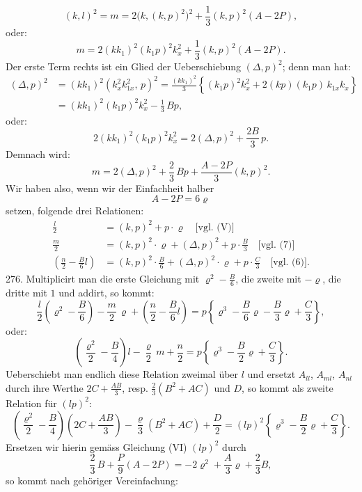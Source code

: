 \documentclass[11pt]{article}
\providecommand{\weberpage}[1]{}
\providecommand{\weq}[2]{\begin{equation}\tag{#1}#2\end{equation}}
\let\Delta\varDelta
\begin{document}
\weberpage{300}
\[
(k,l)^2 = m = 2\big(k,(k,p)^2\big)^2 + \frac{1}{3}(k,p)^2(A-2P),
\]
oder:
\[
m = 2(kk_1)^2(k_1p)^2 k_x^2 + \frac{1}{3}(k,p)^2(A-2P).
\]
Der erste Term rechts ist ein Glied der Ueberschiebung $(\Delta,p)^2$; denn man hat:
\[
\begin{aligned}
(\Delta,p)^2 &= (kk_1)^2(k_x^2 k_{1x}^2,\,p)^2 = \frac{(kk_1)^2}{3}\left\{ (k_1p)^2 k_x^2 + 2(kp)(k_1p)\,k_{1x} k_x \right\} \\
&= (kk_1)^2(k_1p)^2 k_x^2 - \frac{1}{3}\,Bp,
\end{aligned}
\]
oder:
\[
2(kk_1)^2(k_1p)^2 k_x^2 = 2(\Delta,p)^2 + \frac{2B}{3}\,p.
\]
Demnach wird:
\weq{7}{
m = 2(\Delta,p)^2 + \frac{2}{3}\,Bp + \frac{A-2P}{3}(k,p)^2.
}
Wir haben also, wenn wir der Einfachheit halber
\[
A - 2P = 6\varrho
\]
setzen, folgende drei Relationen:
\[
\begin{aligned}
\frac{l}{2} &= (k,p)^2 + p\cdot\varrho \quad\text{[vgl.\ (V)]} \\
\frac{m}{2} &= (k,p)^2\cdot\varrho + (\Delta,p)^2 + p\cdot\frac{B}{3} \quad\text{[vgl.\ (7)]} \\
\left(\frac{n}{2}-\frac{B}{6}l\right) &= (k,p)^2\cdot\frac{B}{6} + (\Delta,p)^2\cdot\varrho + p\cdot\frac{C}{3} \quad\text{[vgl.\ (6)].}
\end{aligned}
\]
276. Multiplicirt man die erste Gleichung mit $\varrho^2-\frac{B}{6}$, die zweite mit $-\varrho$, die dritte mit $1$ und addirt, so kommt:
\[
\frac{l}{2}\left(\varrho^2-\frac{B}{6}\right) - \frac{m}{2}\,\varrho + \left(\frac{n}{2}-\frac{B}{6}l\right) = p\left\{ \varrho^3 - \frac{B}{6}\varrho - \frac{B}{3}\varrho + \frac{C}{3} \right\},
\]
oder:
\[
\left(\frac{\varrho^2}{2}-\frac{B}{4}\right) l - \frac{\varrho}{2}\,m + \frac{n}{2} = p\left\{ \varrho^3 - \frac{B}{2}\varrho + \frac{C}{3} \right\}.
\]
Ueberschiebt man endlich diese Relation zweimal über $l$ und ersetzt $A_{ll}$, $A_{ml}$, $A_{nl}$ durch ihre Werthe $2C+\frac{AB}{3}$, resp. $\frac{2}{3}(B^2+AC)$ und $D$, so kommt als zweite Relation für $(lp)^2$:
\[
\left(\frac{\varrho^2}{2}-\frac{B}{4}\right)\left(2C+\frac{AB}{3}\right) - \frac{\varrho}{3}(B^2+AC) + \frac{D}{2} = (lp)^2\left\{ \varrho^3 - \frac{B}{2}\varrho + \frac{C}{3} \right\}.
\]
Ersetzen wir hierin gemäss Gleichung (VI) $(lp)^2$ durch
\[
\frac{2}{3}\,B + \frac{P}{9}(A-2P) = -2\varrho^2 + \frac{A}{3}\varrho + \frac{2}{3}B,
\]
so kommt nach gehöriger Vereinfachung:


\weberpage{301}
\end{document}
